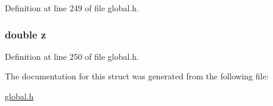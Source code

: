 Definition at line 249 of file global.\-h.

\hypertarget{structdoubleVector3d_ab3e6ed577a7c669c19de1f9c1b46c872}{
\subsubsection[{z}]{\setlength{\rightskip}{0pt plus 5cm}double z}}\label{structdoubleVector3d_ab3e6ed577a7c669c19de1f9c1b46c872}


Definition at line 250 of file global.\-h.



The documentation for this struct was generated from the following file\-:\begin{DoxyCompactItemize}
\item 
\hyperlink{global_8h}{global.\-h}\end{DoxyCompactItemize}
